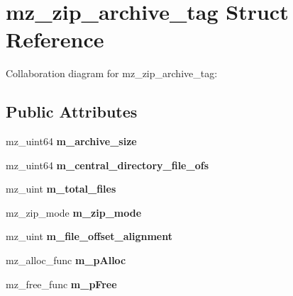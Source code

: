 \hypertarget{structmz__zip__archive__tag}{}\section{mz\+\_\+zip\+\_\+archive\+\_\+tag Struct Reference}
\label{structmz__zip__archive__tag}


Collaboration diagram for mz\+\_\+zip\+\_\+archive\+\_\+tag\+:
\subsection*{Public Attributes}
\begin{DoxyCompactItemize}
\item 
\mbox{\label{structmz__zip__archive__tag_af5117c04008ecd572508f136876db80e}} 
mz\+\_\+uint64 {\bfseries m\+\_\+archive\+\_\+size}
\item 
\mbox{\label{structmz__zip__archive__tag_ab249c8c383a7e7941787d96c19f4398e}} 
mz\+\_\+uint64 {\bfseries m\+\_\+central\+\_\+directory\+\_\+file\+\_\+ofs}
\item 
\mbox{\label{structmz__zip__archive__tag_a34eb45b23728b47dda13d2a5d44e3268}} 
mz\+\_\+uint {\bfseries m\+\_\+total\+\_\+files}
\item 
\mbox{\label{structmz__zip__archive__tag_a002006fe649d710372a47178f817d67f}} 
mz\+\_\+zip\+\_\+mode {\bfseries m\+\_\+zip\+\_\+mode}
\item 
\mbox{\label{structmz__zip__archive__tag_a65668944eaf9a001aec06191f9b348de}} 
mz\+\_\+uint {\bfseries m\+\_\+file\+\_\+offset\+\_\+alignment}
\item 
\mbox{\label{structmz__zip__archive__tag_a459df1597522bded6f203e36ed2cc722}} 
mz\+\_\+alloc\+\_\+func {\bfseries m\+\_\+p\+Alloc}
\item 
\mbox{\label{structmz__zip__archive__tag_a99187a8cbda9084cc8aad170810d20bc}} 
mz\+\_\+free\+\_\+func {\bfseries m\+\_\+p\+Free}
\item 
\mbox{\label{structmz__zip__archive__tag_a871937a81f88fed84d1632dfe4e22222}} 

\end{DoxyCompactItemize}

